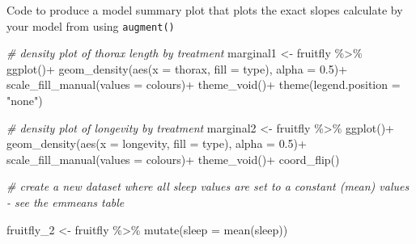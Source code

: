 \documentclass[
]{book}
\newenvironment{Shaded}{\begin{snugshade}}{\end{snugshade}}
\newcommand{\AttributeTok}[1]{\textcolor[rgb]{0.77,0.63,0.00}{#1}}
\newcommand{\CommentTok}[1]{\textcolor[rgb]{0.56,0.35,0.01}{\textit{#1}}}
\newcommand{\FloatTok}[1]{\textcolor[rgb]{0.00,0.00,0.81}{#1}}
\newcommand{\FunctionTok}[1]{\textcolor[rgb]{0.00,0.00,0.00}{#1}}
\newcommand{\NormalTok}[1]{#1}
\newcommand{\OtherTok}[1]{\textcolor[rgb]{0.56,0.35,0.01}{#1}}
\newcommand{\SpecialCharTok}[1]{\textcolor[rgb]{0.00,0.00,0.00}{#1}}
\newcommand{\StringTok}[1]{\textcolor[rgb]{0.31,0.60,0.02}{#1}}
\begin{document}
Code to produce a model summary plot that plots the exact slopes calculate by your model from using \texttt{augment()}

\begin{Shaded}
\begin{Highlighting}[]
\CommentTok{\# density plot of thorax length by treatment}
\NormalTok{marginal1 }\OtherTok{\textless{}{-}}\NormalTok{ fruitfly }\SpecialCharTok{\%\textgreater{}\%} 
  \FunctionTok{ggplot}\NormalTok{()}\SpecialCharTok{+}
  \FunctionTok{geom\_density}\NormalTok{(}\FunctionTok{aes}\NormalTok{(}\AttributeTok{x =}\NormalTok{ thorax, }\AttributeTok{fill =}\NormalTok{ type),}
               \AttributeTok{alpha =} \FloatTok{0.5}\NormalTok{)}\SpecialCharTok{+}
  \FunctionTok{scale\_fill\_manual}\NormalTok{(}\AttributeTok{values =}\NormalTok{ colours)}\SpecialCharTok{+}
  \FunctionTok{theme\_void}\NormalTok{()}\SpecialCharTok{+}
  \FunctionTok{theme}\NormalTok{(}\AttributeTok{legend.position =} \StringTok{"none"}\NormalTok{)}

\CommentTok{\# density plot of longevity by treatment}
\NormalTok{marginal2 }\OtherTok{\textless{}{-}}\NormalTok{ fruitfly }\SpecialCharTok{\%\textgreater{}\%} 
  \FunctionTok{ggplot}\NormalTok{()}\SpecialCharTok{+}
  \FunctionTok{geom\_density}\NormalTok{(}\FunctionTok{aes}\NormalTok{(}\AttributeTok{x =}\NormalTok{ longevity, }\AttributeTok{fill =}\NormalTok{ type),}
               \AttributeTok{alpha =} \FloatTok{0.5}\NormalTok{)}\SpecialCharTok{+}
  \FunctionTok{scale\_fill\_manual}\NormalTok{(}\AttributeTok{values =}\NormalTok{ colours)}\SpecialCharTok{+}
  \FunctionTok{theme\_void}\NormalTok{()}\SpecialCharTok{+}
  \FunctionTok{coord\_flip}\NormalTok{()}


\CommentTok{\# create a new dataset where all sleep values are set to a constant (mean) values {-} see the emmeans table}

\NormalTok{fruitfly\_2 }\OtherTok{\textless{}{-}}\NormalTok{ fruitfly }\SpecialCharTok{\%\textgreater{}\%} 
  \FunctionTok{mutate}\NormalTok{(}\AttributeTok{sleep =} \FunctionTok{mean}\NormalTok{(sleep))}


\end{Highlighting}
\end{Shaded}
\end{document}
